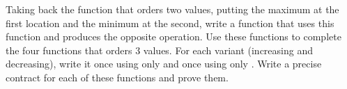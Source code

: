\label{l4:contract-modularity-ex-order-3}


Taking back the function  that orders two values,
putting the maximum at the first location and the minimum at the second, 
write a function  that uses this function and
produces the opposite operation. Use these functions to complete the
four functions that orders 3 values. For each variant (increasing and
decreasing), write it once using only  and once
using only . Write a precise contract for each of
these functions and prove them.



